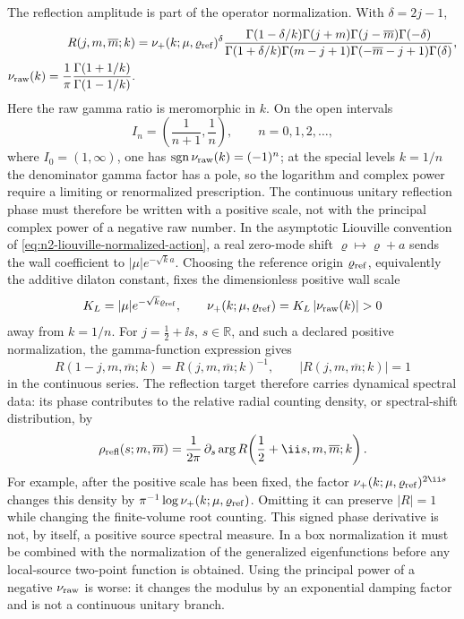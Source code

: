 The reflection amplitude is part of the operator normalization.  With
\(\delta=2j-1\),
\begin{align}
  R(j,m,\overline m;k)
  &=
  \nu_+(k;\mu,\varrho_{\rm ref})^{\delta}
  \frac{
  \Gamma(1-\delta/k)\Gamma(j+m)\Gamma(j-\overline m)\Gamma(-\delta)}
  {\Gamma(1+\delta/k)\Gamma(m-j+1)
  \Gamma(-\overline m-j+1)\Gamma(\delta)},
  \label{eq:n2-cigar-reflection-amplitude}\\
  \nu_{\rm raw}(k)=\frac1\pi
  \frac{\Gamma(1+1/k)}{\Gamma(1-1/k)} .
  \notag
\end{align}
Here the raw gamma ratio is meromorphic in \(k\).  On the open intervals
\[
  I_n=\left(\frac1{n+1},\frac1n\right),
  \qquad n=0,1,2,\ldots ,
\]
where \(I_0=(1,\infty)\), one has
\(\operatorname{sgn}\nu_{\rm raw}(k)=(-1)^n\); at the special levels
\(k=1/n\) the denominator gamma factor has a pole, so the logarithm and complex
power require a limiting or renormalized prescription.  The continuous
unitary reflection phase must therefore be written with a positive scale, not
with the principal complex power of a negative raw number.  In the asymptotic
Liouville convention of \eqref{eq:n2-liouville-normalized-action}, a real
zero-mode shift \(\varrho\mapsto\varrho+a\) sends the wall coefficient to
\(|\mu|e^{-\sqrt{k}a}\).  Choosing the reference origin
\(\varrho_{\rm ref}\), equivalently the additive dilaton constant, fixes the
dimensionless positive wall scale
\[
  K_L=|\mu|e^{-\sqrt{k}\varrho_{\rm ref}},
  \qquad
  \nu_+(k;\mu,\varrho_{\rm ref})
  =
  K_L\,|\nu_{\rm raw}(k)|>0
\]
away from \(k=1/n\).  For \(j=\frac12+\ii s\), \(s\in\mathbb R\), and such a
declared positive normalization, the gamma-function expression gives
\[
  R(1-j,m,\overline m;k)=R(j,m,\overline m;k)^{-1},
  \qquad |R(j,m,\overline m;k)|=1
\]
in the continuous series.  The reflection target therefore carries dynamical
spectral data: its phase contributes to the relative radial counting density,
or spectral-shift distribution, by
\[
  \rho_{\rm refl}(s;m,\overline m)
  =
  \frac1{2\pi}\,\partial_s
  \arg R\!\left(\frac12+\ii s,m,\overline m;k\right).
\]
For example, after the positive scale has been fixed, the factor
\(\nu_+(k;\mu,\varrho_{\rm ref})^{2\ii s}\) changes this density by
\(\pi^{-1}\log\nu_+(k;\mu,\varrho_{\rm ref})\).  Omitting it can preserve
\(|R|=1\) while changing the finite-volume root counting.  This signed
phase derivative is not, by itself, a positive source spectral measure.  In a
box normalization it must be combined with the normalization of the generalized
eigenfunctions before any local-source two-point function is obtained.  Using
the principal power of a negative \(\nu_{\rm raw}\) is worse: it changes the
modulus by an exponential damping factor and is not a continuous unitary
branch.

